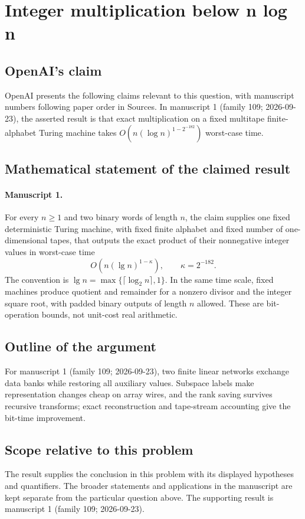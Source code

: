 \documentclass[11pt]{article}
\begin{document}
\section*{Integer multiplication below n log n}

\subsection{OpenAI's claim}
OpenAI presents the following claims relevant to this question, with manuscript numbers following paper order in Sources. In manuscript 1 (family 109; 2026-09-23), the asserted result is that exact multiplication on a fixed multitape finite-alphabet Turing machine takes $O(n(\log n)^{1-2^{-182}})$ worst-case time.

\subsection{Mathematical statement of the claimed result}
\paragraph{Manuscript 1.}
For every $n\ge1$ and two binary words of length $n$, the claim supplies one fixed deterministic Turing machine, with fixed finite alphabet and fixed number of one-dimensional tapes, that outputs the exact product of their nonnegative integer values in worst-case time
\[
 O(n(\lg n)^{1-\kappa}),\qquad\kappa=2^{-182}.
\]
The convention is $\lg n=\max\{\lceil\log_2n\rceil,1\}$. In the same time scale, fixed machines produce quotient and remainder for a nonzero divisor and the integer square root, with padded binary outputs of length $n$ allowed. These are bit-operation bounds, not unit-cost real arithmetic.

\subsection{Outline of the argument}
For manuscript 1 (family 109; 2026-09-23), two finite linear networks exchange data banks while restoring all auxiliary values. Subspace labels make representation changes cheap on array wires, and the rank saving survives recursive transforms; exact reconstruction and tape-stream accounting give the bit-time improvement.

\subsection{Scope relative to this problem}
The result supplies the conclusion in this problem with its displayed hypotheses and quantifiers. The broader statements and applications in the manuscript are kept separate from the particular question above. The supporting result is manuscript 1 (family 109; 2026-09-23).
\end{document}
